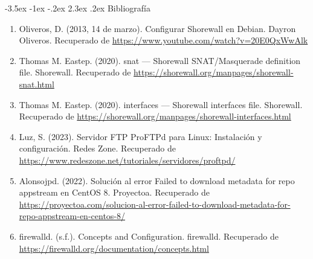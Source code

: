 \documentclass[11pt]{report}
\makeatletter
\renewcommand\chapter{\@startsection{chapter}{0}{\z@}%
    {-3.5ex \@plus -1ex \@minus -.2ex}%
    {2.3ex \@plus.2ex}%
    {\normalfont\Large\bfseries}}
\makeatother
\begin{document}
\chapter{Bibliografía} %
\begin{enumerate}
\item Oliveros, D. (2013, 14 de marzo). Configurar Shorewall en Debian. Dayron Oliveros. Recuperado de \url{https://www.youtube.com/watch?v=20E0QxWwAlk}
\item Thomas M. Eastep. (2020). snat — Shorewall SNAT/Masquerade definition file. Shorewall. Recuperado de \url{https://shorewall.org/manpages/shorewall-snat.html}
\item Thomas M. Eastep. (2020). interfaces — Shorewall interfaces file. Shorewall. Recuperado de \url{https://shorewall.org/manpages/shorewall-interfaces.html}
\item Luz, S. (2023). Servidor FTP ProFTPd para Linux: Instalación y configuración. Redes Zone. Recuperado de \url{https://www.redeszone.net/tutoriales/servidores/proftpd/}
\item Alonsojpd. (2022). Solución al error Failed to download metadata for repo appstream en CentOS 8. Proyectoa. Recuperado de \url{https://proyectoa.com/solucion-al-error-failed-to-download-metadata-for-repo-appstream-en-centos-8/}
\item firewalld. (s.f.). Concepts and Configuration. firewalld. Recuperado de \url{https://firewalld.org/documentation/concepts.html}
\end{enumerate}
\end{document}
